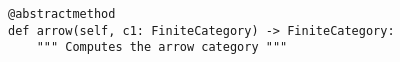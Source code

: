 \par\begin{minipage}{60ex}
\begin{verbatim}
@abstractmethod
def arrow(self, c1: FiniteCategory) -> FiniteCategory:
    """ Computes the arrow category """
\end{verbatim}
\end{minipage}\par